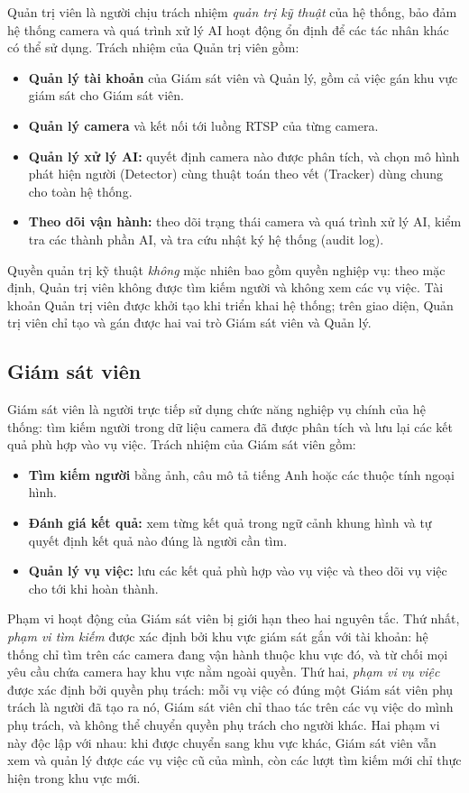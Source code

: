 Quản trị viên là người chịu trách nhiệm \emph{quản trị kỹ thuật} của hệ thống, bảo đảm hệ thống camera và quá trình xử lý AI hoạt động ổn định để các tác nhân khác có thể sử dụng. Trách nhiệm của Quản trị viên gồm:
\begin{itemize}
    \item \textbf{Quản lý tài khoản} của Giám sát viên và Quản lý, gồm cả việc gán khu vực giám sát cho Giám sát viên.
    \item \textbf{Quản lý camera} và kết nối tới luồng RTSP của từng camera.
    \item \textbf{Quản lý xử lý AI:} quyết định camera nào được phân tích, và chọn mô hình phát hiện người (Detector) cùng thuật toán theo vết (Tracker) dùng chung cho toàn hệ thống.
    \item \textbf{Theo dõi vận hành:} theo dõi trạng thái camera và quá trình xử lý AI, kiểm tra các thành phần AI, và tra cứu nhật ký hệ thống (audit log).
\end{itemize}

Quyền quản trị kỹ thuật \emph{không} mặc nhiên bao gồm quyền nghiệp vụ: theo mặc định, Quản trị viên không được tìm kiếm người và không xem các vụ việc. Tài khoản Quản trị viên được khởi tạo khi triển khai hệ thống; trên giao diện, Quản trị viên chỉ tạo và gán được hai vai trò Giám sát viên và Quản lý.

\subsection{Giám sát viên}
\label{sec:4.1.2}

Giám sát viên là người trực tiếp sử dụng chức năng nghiệp vụ chính của hệ thống: tìm kiếm người trong dữ liệu camera đã được phân tích và lưu lại các kết quả phù hợp vào vụ việc. Trách nhiệm của Giám sát viên gồm:
\begin{itemize}
    \item \textbf{Tìm kiếm người} bằng ảnh, câu mô tả tiếng Anh hoặc các thuộc tính ngoại hình.
    \item \textbf{Đánh giá kết quả:} xem từng kết quả trong ngữ cảnh khung hình và tự quyết định kết quả nào đúng là người cần tìm.
    \item \textbf{Quản lý vụ việc:} lưu các kết quả phù hợp vào vụ việc và theo dõi vụ việc cho tới khi hoàn thành.
\end{itemize}

Phạm vi hoạt động của Giám sát viên bị giới hạn theo hai nguyên tắc. Thứ nhất, \emph{phạm vi tìm kiếm} được xác định bởi khu vực giám sát gắn với tài khoản: hệ thống chỉ tìm trên các camera đang vận hành thuộc khu vực đó, và từ chối mọi yêu cầu chứa camera hay khu vực nằm ngoài quyền. Thứ hai, \emph{phạm vi vụ việc} được xác định bởi quyền phụ trách: mỗi vụ việc có đúng một Giám sát viên phụ trách là người đã tạo ra nó, Giám sát viên chỉ thao tác trên các vụ việc do mình phụ trách, và không thể chuyển quyền phụ trách cho người khác. Hai phạm vi này độc lập với nhau: khi được chuyển sang khu vực khác, Giám sát viên vẫn xem và quản lý được các vụ việc cũ của mình, còn các lượt tìm kiếm mới chỉ thực hiện trong khu vực mới.


